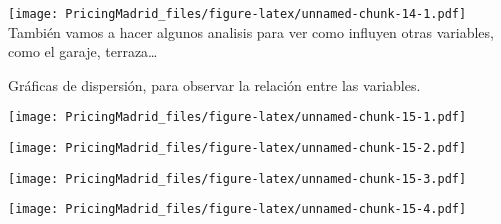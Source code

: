 \documentclass[
]{article}
\newenvironment{Shaded}{\begin{snugshade}}{\end{snugshade}}
\newcommand{\AttributeTok}[1]{\textcolor[rgb]{0.77,0.63,0.00}{#1}}
\newcommand{\FunctionTok}[1]{\textcolor[rgb]{0.00,0.00,0.00}{#1}}
\newcommand{\NormalTok}[1]{#1}
\newcommand{\SpecialCharTok}[1]{\textcolor[rgb]{0.00,0.00,0.00}{#1}}
\begin{document}
\texttt{[image: PricingMadrid\_files/figure-latex/unnamed-chunk-14-1.pdf]}
También vamos a hacer algunos analisis para ver como influyen otras
variables, como el garaje, terraza\ldots{}

Gráficas de dispersión, para observar la relación entre las variables.

\begin{Shaded}
\end{Shaded}

\texttt{[image: PricingMadrid\_files/figure-latex/unnamed-chunk-15-1.pdf]}

\begin{Shaded}
\end{Shaded}

\texttt{[image: PricingMadrid\_files/figure-latex/unnamed-chunk-15-2.pdf]}

\begin{Shaded}
\end{Shaded}

\texttt{[image: PricingMadrid\_files/figure-latex/unnamed-chunk-15-3.pdf]}

\begin{Shaded}
\end{Shaded}

\texttt{[image: PricingMadrid\_files/figure-latex/unnamed-chunk-15-4.pdf]}
\end{document}
